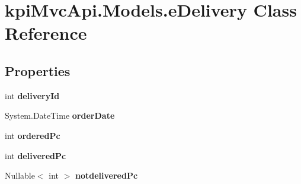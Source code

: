 \hypertarget{classkpi_mvc_api_1_1_models_1_1e_delivery}{}\section{kpi\+Mvc\+Api.\+Models.\+e\+Delivery Class Reference}
\label{classkpi_mvc_api_1_1_models_1_1e_delivery}
\subsection*{Properties}
\begin{DoxyCompactItemize}
\item 
\mbox{\label{classkpi_mvc_api_1_1_models_1_1e_delivery_a27d662c39ab697df7cca8ffc6bd07d56}} 
int {\bfseries delivery\+Id}
\item 
\mbox{\label{classkpi_mvc_api_1_1_models_1_1e_delivery_a0fea3a43fefa66619cfe204f09af9c13}} 
System.\+Date\+Time {\bfseries order\+Date}
\item 
\mbox{\label{classkpi_mvc_api_1_1_models_1_1e_delivery_a7e84600c0076d7eda44d598e028c4472}} 
int {\bfseries ordered\+Pc}
\item 
\mbox{\label{classkpi_mvc_api_1_1_models_1_1e_delivery_a3361eda53db33d04571cb0d86e6a3e4c}} 
int {\bfseries delivered\+Pc}
\item 
\mbox{\label{classkpi_mvc_api_1_1_models_1_1e_delivery_a926ff2a872a98cccfd72dab827a9b273}} 
Nullable$<$ int $>$ {\bfseries notdelivered\+Pc}
\item 
\mbox{\label{classkpi_mvc_api_1_1_models_1_1e_delivery_af7ad3ae216a55ec0bb62e8fcffa3d49a}} 

\end{DoxyCompactItemize}
